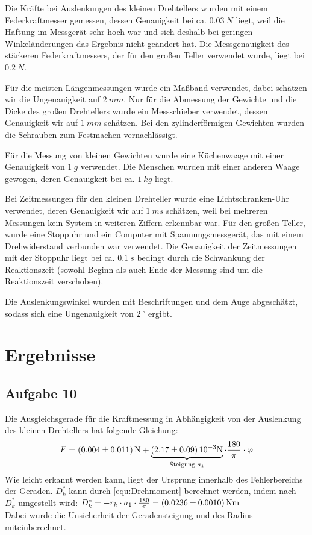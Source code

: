 \documentclass[a4paper, 11pt, ngerman]{scrartcl}
\begin{document}
Die Kräfte bei Auslenkungen des kleinen Drehtellers wurden mit einem Federkraftmesser gemessen, dessen Genauigkeit bei ca. $\SI{0.03}{N}$ liegt, weil die Haftung im Messgerät sehr hoch war und sich deshalb bei geringen Winkeländerungen das Ergebnis nicht geändert hat. Die Messgenauigkeit des stärkeren Federkraftmessers, der für den großen Teller verwendet wurde, liegt bei $\SI{0.2}{N}$.

Für die meisten Längenmessungen wurde ein Maßband verwendet, dabei schätzen wir die Ungenauigkeit auf $\SI{2}{mm}$. Nur für die Abmessung der Gewichte und die Dicke des großen Drehtellers wurde ein Messschieber verwendet, dessen Genauigkeit wir auf $\SI{1}{mm}$ schätzen. Bei den zylinderförmigen Gewichten wurden die Schrauben zum Festmachen vernachlässigt.

Für die Messung von kleinen Gewichten wurde eine Küchenwaage mit einer Genauigkeit von $\SI{1}{g}$ verwendet. Die Menschen wurden mit einer anderen Waage gewogen, deren Genauigkeit bei ca. $\SI{1}{kg}$ liegt.

Bei Zeitmessungen für den kleinen Drehteller wurde eine Lichtschranken-Uhr verwendet, deren Genauigkeit wir auf $\SI{1}{ms}$ schätzen, weil bei mehreren Messungen kein System in weiteren Ziffern erkennbar war. Für den großen Teller, wurde eine Stoppuhr und ein Computer mit Spannungsmessgerät, das mit einem Drehwiderstand verbunden war verwendet. Die Genauigkeit der Zeitmessungen mit der Stoppuhr liegt bei ca. $\SI{0.1}{s}$ bedingt durch die Schwankung der Reaktionszeit (sowohl Beginn als auch Ende der Messung sind um die Reaktionszeit verschoben).

Die Auslenkungswinkel wurden mit Beschriftungen und dem Auge abgeschätzt, sodass sich eine Ungenauigkeit von $\SI{2}{^\circ}$ ergibt.

\section{Ergebnisse}
\subsection{Aufgabe 10}

Die Ausgleichsgerade für die Kraftmessung in Abhängigkeit von der Auslenkung des kleinen Drehtellers hat folgende Gleichung:
\begin{equation}
F = \SI{0.004 \pm 0.011}{N} + \underbrace{\SI{2.17 \pm 0.09}{10^{-3}N}}_{\text{Steigung } a_1} \cdot \frac{180}{\pi} \cdot \varphi
\end{equation}
Wie leicht erkannt werden kann, liegt der Ursprung innerhalb des Fehlerbereichs der Geraden. $D^*_k$ kann durch \cref{equ:Drehmoment} berechnet werden, indem nach $D^*_k$ umgestellt wird: $D^*_k = -r_k \cdot a_1 \cdot \frac{180}{\pi} = \SI{0.0236 \pm 0.0010}{Nm}$\\
Dabei wurde die Unsicherheit der Geradensteigung und des Radius miteinberechnet.
\end{document}
